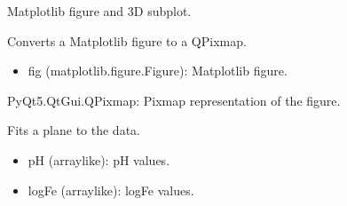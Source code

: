 \documentclass[a4paper,10pt,english]{sphinxmanual}
\begin{document}
\begin{fulllineitems}
\begin{fulllineitems}
\begin{description}
\sphinxAtStartPar
Matplotlib figure and 3D subplot.

\end{description}

\end{fulllineitems}


\begin{fulllineitems}
\label{\detokenize{utils:src.utils.plane3D_plot.Plane3DPlotter.fig_to_pixmap}}
\pysigstartsignatures
{}
\pysigstopsignatures
\sphinxAtStartPar
Converts a Matplotlib figure to a QPixmap.
\begin{description}
\begin{itemize}
\item {} 
\sphinxAtStartPar
fig (matplotlib.figure.Figure): Matplotlib figure.

\end{itemize}

\sphinxAtStartPar
PyQt5.QtGui.QPixmap: Pixmap representation of the figure.

\end{description}

\end{fulllineitems}


\begin{fulllineitems}
\label{\detokenize{utils:src.utils.plane3D_plot.Plane3DPlotter.fit_plane}}
\pysigstartsignatures
{}
\pysigstopsignatures
\sphinxAtStartPar
Fits a plane to the data.
\begin{description}
\begin{itemize}
\item {} 
\sphinxAtStartPar
pH (array\sphinxhyphen{}like): pH values.

\item {} 
\sphinxAtStartPar
logFe (array\sphinxhyphen{}like): logFe values.


\end{itemize}
\end{description}
\end{fulllineitems}
\end{fulllineitems}
\end{document}
